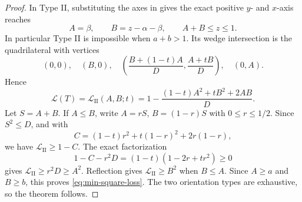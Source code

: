 \begin{proof}
In Type II, substituting the axes in  gives
the exact positive $y$- and $x$-axis reaches
\begin{equation}
 A=\beta,\qquad B=z-\alpha-\beta,\qquad A+B\le z\le1.
 \label{eq:area-type-II-reaches}
\end{equation}
In particular Type II is impossible when $a+b>1$.  Its wedge intersection
is the quadrilateral with vertices
\[
 (0,0),\quad(B,0),\quad
 \left(\frac{B+(1-t)A}{D},\frac{A+tB}{D}\right),
 \quad(0,A).
\]
Hence
\begin{equation}
 \mathcal L(T)=\mathcal L_{\mathrm{II}}(A,B;t)
 =1-\frac{(1-t)A^2+tB^2+2AB}{D}.              \label{eq:type-II-loss}
\end{equation}
Let $S=A+B$.  If $A\le B$, write $A=rS$, $B=(1-r)S$ with
$0\le r\le1/2$.  Since $S^2\le D$, and with
\[
 C=(1-t)r^2+t(1-r)^2+2r(1-r),
\]
we have $\mathcal L_{\mathrm{II}}\ge1-C$.  The exact factorization
\[
 1-C-r^2D=(1-t)(1-2r+tr^2)\ge0
\]
gives $\mathcal L_{\mathrm{II}}\ge r^2D\ge A^2$.  Reflection gives
$\mathcal L_{\mathrm{II}}\ge B^2$ when $B\le A$.  Since $A\ge a$ and $B\ge b$,
this proves \eqref{eq:min-square-loss}.  The two orientation types are
exhaustive, so the theorem follows.
\end{proof}
